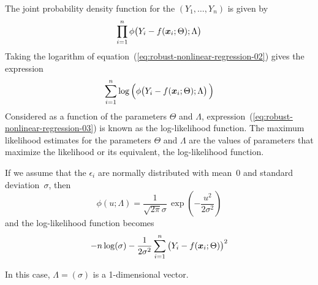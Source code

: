 \documentclass{admbmanual}
\begin{document}
The joint probability density function for the $(Y_1,\ldots,Y_n)$ is given by
\begin{equation}\label{eq:robust-nonlinear-regression-02} %
  \prod_{i=1}^n \phi\big(Y_i-f({\mbox{\boldmath $x$}}_i;\Theta);\Lambda\big)
\end{equation}
Taking the logarithm of equation~(\ref{eq:robust-nonlinear-regression-02}) %
gives the expression
\begin{equation}\label{eq:robust-nonlinear-regression-03} %
  \sum_{i=1}^n \log\Big(\phi\big(Y_i-f({\mbox{\boldmath $x$}}_i;\Theta);\Lambda\big)\,\Big)
\end{equation}
Considered as a function of the parameters $\Theta$ and $\Lambda$, expression~(\ref{eq:robust-nonlinear-regression-03}) %
is known as the log-likelihood function. The maximum likelihood estimates 
for the parameters $\Theta$ and $\Lambda$ are the values of parameters that maximize the likelihood or its equivalent, the log-likelihood function.

If we assume that the $\epsilon_i$ are normally distributed with
mean~$0$ and standard deviation~$\sigma$, then
\begin{equation*}
  \phi(u;\Lambda)= \frac{1}{\sqrt{2\pi}\sigma} 
    \,\exp\left(-\frac{u^2}{2\sigma^2}\right)
\end{equation*}
and the log-likelihood function becomes
\begin{equation}\label{eq:robust-nonlinear-regression-04} %
  -n\log(\sigma)-\frac{1}{2\sigma^2}\sum_{i=1}^n\big(Y_i-f({\mbox{\boldmath $x$}}_i;\Theta)\big)^2
\end{equation}
             
In this case, $\Lambda=(\sigma)$ is a 1-dimensional vector.
\end{document}

